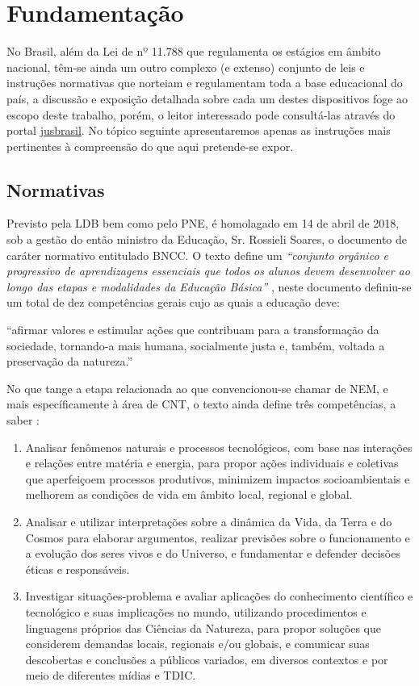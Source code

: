\section{Fundamentação} %
\label{sec:Referenciais}
No Brasil, além da Lei de nº 11.788 que regulamenta os estágios em âmbito nacional, têm-se ainda um outro complexo (e extenso) conjunto de leis e instruções normativas que norteiam e regulamentam toda a base educacional do país, a discussão e exposição detalhada sobre cada um destes dispositivos foge ao escopo deste trabalho, porém, o leitor interessado pode consultá-las através do portal \href{https://www.jusbrasil.com.br/}{jusbrasil}. No tópico seguinte apresentaremos apenas as instruções mais pertinentes à compreensão do que aqui pretende-se expor.

\subsection{Normativas} %
\label{sec:Referênciais normativos}
Previsto pela \ac{LDB} bem como pelo \ac{PNE}, é homolagado em 14 de abril de 2018, sob a gestão do então ministro da Educação, Sr. Rossieli Soares, o documento de caráter normativo entitulado \ac{BNCC}. O texto define um \textit{``conjunto orgânico e progressivo de aprendizagens essenciais que todos os alunos devem desenvolver ao longo das etapas e modalidades da Educação Básica''} \cite{BRASIL:2017}, neste documento definiu-se um total de dez competências gerais cujo as quais a educação deve:

\begin{citacao}
	``afirmar valores e estimular ações que contribuam para a transformação da sociedade, tornando-a mais humana, socialmente justa e, também, voltada a preservação da natureza.'' 
\end{citacao}

No que tange a etapa relacionada ao que convencionou-se chamar de \ac{NEM}, e mais específicamente à área de \ac{CNT}, o texto ainda define três competências, a saber :
\begin{enumerate}
	\item Analisar fenômenos naturais e processos tecnológicos, com base nas interações e relações entre matéria e energia, para propor ações individuais e coletivas que aperfeiçoem processos produtivos, minimizem impactos socioambientais e melhorem as condições de vida em âmbito local, regional e global.
	\item Analisar e utilizar interpretações sobre a dinâmica da Vida, da Terra e do Cosmos para elaborar argumentos, realizar previsões sobre o funcionamento e a evolução dos seres vivos e do Universo, e fundamentar e defender decisões éticas e responsáveis.
	\item Investigar situações-problema e avaliar aplicações do conhecimento científico e tecnológico e suas implicações no mundo, utilizando procedimentos e linguagens próprios das Ciências da Natureza, para propor soluções que considerem demandas locais, regionais e/ou globais, e comunicar suas descobertas e conclusões a públicos variados, em diversos contextos e por meio de diferentes mídias e \ac{TDIC}.
\end{enumerate}

